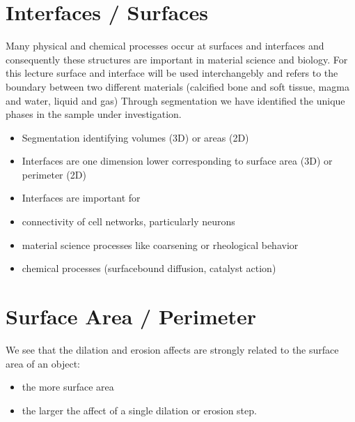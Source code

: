 \documentclass[letterpaper,10pt,english]{sphinxmanual}
\begin{document}
\chapter{Interfaces / Surfaces}
\label{\detokenize{06-AdvancedShapeAndTexture:interfaces-surfaces}}
\sphinxAtStartPar
Many physical and chemical processes occur at surfaces and interfaces and consequently these structures are important in material science and biology. For this lecture surface and interface will be used interchangebly and refers to the boundary between two different materials (calcified bone and soft tissue, magma and water, liquid and gas) Through segmentation we have identified the unique phases in the sample under investigation.
\begin{itemize}
\item {} 
\sphinxAtStartPar
Segmentation identifying volumes (3D) or areas (2D)

\item {} 
\sphinxAtStartPar
Interfaces are one dimension lower corresponding to surface area (3D) or perimeter (2D)

\item {} 
\sphinxAtStartPar
Interfaces are important for

\item {} 
\sphinxAtStartPar
connectivity of cell networks, particularly neurons

\item {} 
\sphinxAtStartPar
material science processes like coarsening or rheological behavior

\item {} 
\sphinxAtStartPar
chemical processes (surface\sphinxhyphen{}bound diffusion, catalyst action)

\end{itemize}


\chapter{Surface Area / Perimeter}
\label{\detokenize{06-AdvancedShapeAndTexture:surface-area-perimeter}}
\sphinxAtStartPar
We see that the dilation and erosion affects are strongly related to the surface area of an object:
\begin{itemize}
\item {} 
\sphinxAtStartPar
the more surface area

\item {} 
\sphinxAtStartPar
the larger the affect of a single dilation or erosion step.

\end{itemize}
\end{document}

